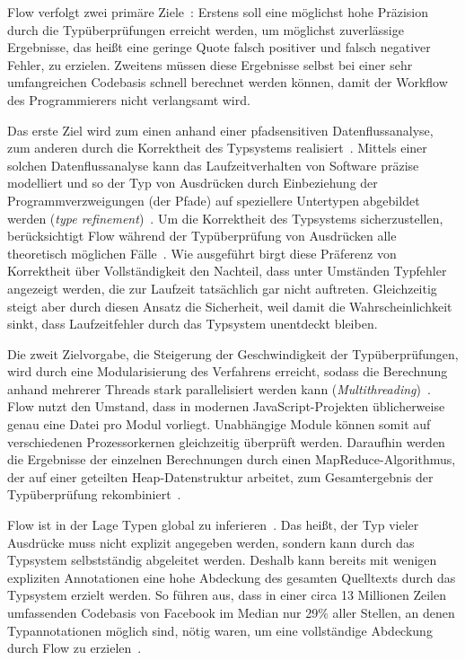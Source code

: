 Flow verfolgt zwei primäre Ziele~\autocite{FLOW:TYPE_SYSTEM}: Erstens soll eine möglichst hohe Präzision durch die Typüberprüfungen erreicht werden, um möglichst zuverlässige Ergebnisse, das heißt eine geringe Quote falsch positiver und falsch negativer Fehler, zu erzielen. Zweitens müssen diese Ergebnisse selbst bei einer sehr umfangreichen Codebasis schnell berechnet werden können, damit der Workflow des Programmierers nicht verlangsamt wird.

Das erste Ziel wird zum einen anhand einer pfadsensitiven Datenflussanalyse, zum anderen durch die Korrektheit des Typsystems realisiert~\autocite{FLOW:TYPE_SYSTEM}. Mittels einer solchen Datenflussanalyse kann das Laufzeitverhalten von Software präzise modelliert und so der Typ von Ausdrücken durch Einbeziehung der Programmverzweigungen (der Pfade) auf speziellere Untertypen abgebildet werden (\textit{type refinement})~\cites{WINTER:2013}[2]{FLOW:PAPER}.
Um die Korrektheit des Typsystems sicherzustellen, berücksichtigt Flow während der Typüberprüfung von Ausdrücken alle theoretisch möglichen Fälle~\autocite{FLOW:TYPES_AND_EXPRESSIONS}. Wie ausgeführt birgt diese Präferenz von Korrektheit über Vollständigkeit den Nachteil, dass unter Umständen Typfehler angezeigt werden, die zur Laufzeit tatsächlich gar nicht auftreten. Gleichzeitig steigt aber durch diesen Ansatz die Sicherheit, weil damit die Wahrscheinlichkeit sinkt, dass Laufzeitfehler durch das Typsystem unentdeckt bleiben.

Die zweit Zielvorgabe, die Steigerung der Geschwindigkeit der Typüberprüfungen, wird durch eine Modularisierung des Verfahrens erreicht, sodass die Berechnung anhand mehrerer Threads stark parallelisiert werden kann (\textit{Multithreading})~\autocite[4]{FLOW:PAPER}. Flow nutzt den Umstand, dass in modernen JavaScript-Projekten üblicherweise genau eine Datei pro Modul vorliegt. Unabhängige Module können somit auf verschiedenen Prozessorkernen gleichzeitig überprüft werden. Daraufhin werden die Ergebnisse der einzelnen Berechnungen durch einen MapReduce-Algorithmus, der auf einer geteilten Heap-Datenstruktur arbeitet, zum Gesamtergebnis der Typüberprüfung rekombiniert~\autocite[22\psq]{FLOW:PAPER}.

Flow ist in der Lage Typen global zu inferieren~\autocite[25]{FLOW:PAPER}. Das heißt, der Typ vieler Ausdrücke muss nicht explizit angegeben werden, sondern kann durch das Typsystem selbstständig abgeleitet werden. Deshalb kann bereits mit wenigen expliziten Annotationen eine hohe Abdeckung des gesamten Quelltexts durch das Typsystem erzielt werden. So führen \citeauthor{FLOW:PAPER} aus, dass in einer circa 13 Millionen Zeilen umfassenden Codebasis von Facebook im Median nur 29\% aller Stellen, an denen Typannotationen möglich sind, nötig waren, um eine vollständige Abdeckung durch Flow zu erzielen~\autocite[24]{FLOW:PAPER}.

